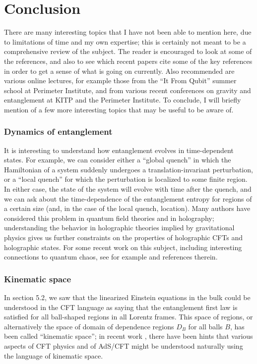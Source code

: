 \documentclass[12pt,epsf]{article}
\begin{document}
\section{Conclusion}

There are many interesting topics that I have not been able to mention here, due to limitations of time and my own expertise; this is certainly not meant to be a comprehensive review of the subject. The reader is encouraged to look at some of the references, and also to see which recent papers cite some of the key references in order to get a sense of what is going on currently. Also recommended are various online lectures, for example those from the ``It From Qubit'' summer school at Perimeter Institute, and from various recent conferences on gravity and entanglement at KITP and the Perimeter Institute. To conclude, I will briefly mention of a few more interesting topics that may be useful to be aware of.

\subsubsection*{Dynamics of entanglement}

It is interesting to understand how entanglement evolves in time-dependent states. For example, we can consider either a ``global quench'' in which the Hamiltonian of a system suddenly undergoes a translation-invariant perturbation, or a ``local quench'' for which the perturbation is localized to some finite region. In either case, the state of the system will evolve with time after the quench, and we can ask about the time-dependence of the entanglement entropy for regions of a certain size (and, in the case of the local quench, location). Many authors have considered this problem in quantum field theories and in holography; understanding the behavior in holographic theories implied by gravitational physics gives us further constraints on the properties of holographic CFTs and holographic states. For some recent work on this subject, including interesting connections to quantum chaos, see for example \cite{Hartman:2013qma,Liu:2013iza,Shenker:2013pqa,Mezei:2016wfz} and references therein.

\subsubsection*{Kinematic space}

In section 5.2, we saw that the linearized Einstein equations in the bulk could be understood in the CFT language as saying that the entanglement first law is satisfied for all ball-shaped regions in all Lorentz frames. This space of regions, or alternatively the space of domain of dependence regions $D_B$ for all balls $B$, has been called ``kinematic space''; in recent work \cite{Czech:2015qta,Czech:2016xec,deBoer:2016pqk}, there have been hints that various aspects of CFT physics and of AdS/CFT might be understood naturally using the language of kinematic space.
\end{document}
